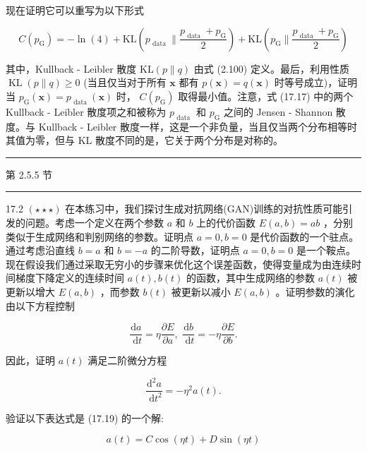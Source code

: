 \documentclass[10pt]{report}
\newcommand{\HRule}{\begin{center}\rule{0.9\linewidth}{0.2mm}\end{center}}
\begin{document}
现在证明它可以重写为以下形式

\[
C\left( {p}_{\mathrm{G}}\right)  =  - \ln \left( 4\right)  + \mathrm{{KL}}\left( {{p}_{\text{ data }}\parallel \frac{{p}_{\text{ data }} + {p}_{\mathrm{G}}}{2}}\right)  + \mathrm{{KL}}\left( {{p}_{\mathrm{G}}\parallel \frac{{p}_{\text{ data }} + {p}_{\mathrm{G}}}{2}}\right)  \tag{17.17}
\]

其中，Kullback - Leibler 散度 \(\mathrm{{KL}}\left( {p\parallel q}\right)\) 由式 (2.100) 定义。最后，利用性质 \(\operatorname{KL}\left( {p\parallel q}\right)  \geq  0\) (当且仅当对于所有 \(\mathbf{x}\) 都有 \(p\left( \mathbf{x}\right)  = q\left( \mathbf{x}\right)\) 时等号成立)，证明当 \({p}_{\mathrm{G}}\left( \mathbf{x}\right)  = {p}_{\text{ data }}\left( \mathbf{x}\right)\) 时， \(C\left( {p}_{\mathrm{G}}\right)\) 取得最小值。注意，式 (17.17) 中的两个 Kullback - Leibler 散度项之和被称为 \({p}_{\text{ data }}\) 和 \({p}_{\mathrm{G}}\) 之间的 Jensen - Shannon 散度。与 Kullback - Leibler 散度一样，这是一个非负量，当且仅当两个分布相等时其值为零，但与 KL 散度不同的是，它关于两个分布是对称的。

\HRule

第 2.5.5 节

\HRule

17.2 \(\left( {\star  \star   \star  }\right)\) 在本练习中，我们探讨生成对抗网络(GAN)训练的对抗性质可能引发的问题。考虑一个定义在两个参数 \(a\) 和 \(b\) 上的代价函数 \(E\left( {a,b}\right)  = {ab}\) ，分别类似于生成网络和判别网络的参数。证明点 \(a = 0,b = 0\) 是代价函数的一个驻点。通过考虑沿直线 \(b = a\) 和 \(b =  - a\) 的二阶导数，证明点 \(a = 0,b = 0\) 是一个鞍点。现在假设我们通过采取无穷小的步骤来优化这个误差函数，使得变量成为由连续时间梯度下降定义的连续时间 \(a\left( t\right) ,b\left( t\right)\) 的函数，其中生成网络的参数 \(a\left( t\right)\) 被更新以增大 \(E\left( {a,b}\right)\) ，而参数 \(b\left( t\right)\) 被更新以减小 \(E\left( {a,b}\right)\) 。证明参数的演化由以下方程控制

\[
\frac{\mathrm{d}a}{\mathrm{\;d}t} = \eta \frac{\partial E}{\partial a},\;\frac{\mathrm{d}b}{\mathrm{\;d}t} =  - \eta \frac{\partial E}{\partial b}. \tag{17.18}
\]

因此，证明 \(a\left( t\right)\) 满足二阶微分方程

\[
\frac{{\mathrm{d}}^{2}a}{\mathrm{\;d}{t}^{2}} =  - {\eta }^{2}a\left( t\right) . \tag{17.19}
\]

验证以下表达式是 (17.19) 的一个解:

\[
a\left( t\right)  = C\cos \left( {\eta t}\right)  + D\sin \left( {\eta t}\right)  \tag{17.20}
\]
\end{document}
